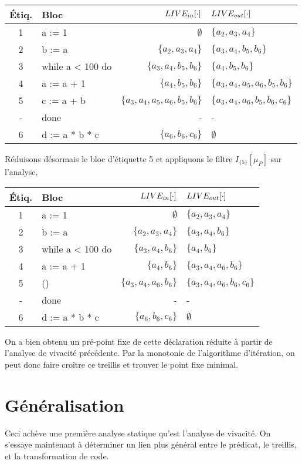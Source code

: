 \documentclass[a4paper, 11pt]{article}
\begin{document}
\begin{center}
	\begin{tabular}{||c|l|r|l||}
	\hline
	Étiq. & Bloc & $LIVE_{in}[\cdot]$ & $LIVE_{out}[\cdot]$ \\
	\hline
	1 & a := 1 & $\emptyset$ & $\{a_2, a_3, a_4\}$\\
	2 & b := a & $\{a_2, a_3, a_4\}$ & $\{a_3, a_4, b_5, b_6\}$\\
	3 & while a < 100 do & $\{a_3, a_4, b_5, b_6\}$ & $\{a_4, b_5, b_6\}$\\
	4 & a := a + 1 & $\{a_4, b_5, b_6\}$ & $\{a_3, a_4, a_5, a_6, b_5, b_6\}$\\
	5 & c := a + b & $\{a_3, a_4, a_5, a_6, b_5, b_6\}$ & $\{a_3, a_4, a_6, b_5, b_6, c_6\}$\\
	- & done & - & -\\
	6 & d := a * b * c & $\{a_6, b_6, c_6\}$ & $\emptyset$\\
	\hline
	\end{tabular}
\end{center}
Réduisons désormais le bloc d'étiquette 5 et appliquons le filtre $I_{\{5\}}[\mu_P]$ sur l'analyse,
\begin{center}
	\begin{tabular}{||c|l|r|l||}
	\hline
	Étiq. & Bloc & $LIVE_{in}[\cdot]$ & $LIVE_{out}[\cdot]$ \\
	\hline
	1 & a := 1 & $\emptyset$ & $\{a_2, a_3, a_4\}$\\
	2 & b := a & $\{a_2, a_3, a_4\}$ & $\{a_3, a_4, b_6\}$\\
	3 & while a < 100 do & $\{a_3, a_4, b_6\}$ & $\{a_4, b_6\}$\\
	4 & a := a + 1 & $\{a_4, b_6\}$ & $\{a_3, a_4, a_6, b_6\}$\\
	5 & () & $\{a_3, a_4, a_6, b_6\}$ & $\{a_3, a_4, a_6, b_6, c_6\}$\\
	- & done & - & -\\
	6 & d := a * b * c & $\{a_6, b_6, c_6\}$ & $\emptyset$\\
	\hline
	\end{tabular}
\end{center}
On a bien obtenu un pré-point fixe de cette déclaration réduite à partir de l'analyse de vivacité précédente.
Par la monotonie de l'algorithme d'itération, on peut donc faire croître ce treillis et trouver le point fixe minimal. 
\section{Généralisation}
Ceci achève une première analyse statique qu'est l'analyse de vivacité. On s'essaye maintenant à déterminer
un lien plus général entre le prédicat, le treillis, et la transformation de code.
\end{document}
